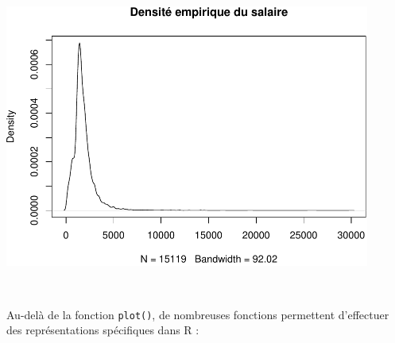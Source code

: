 \documentclass[12pt,twosided, notitlepage]{book}
\begin{document}
\begin{center}\includegraphics[width=12cm]{livret_files/figure-latex/unnamed-chunk-441-2} \end{center}

~

Au-delà de la fonction \texttt{plot()}, de nombreuses fonctions
permettent d'effectuer des représentations spécifiques dans R :
\end{document}

